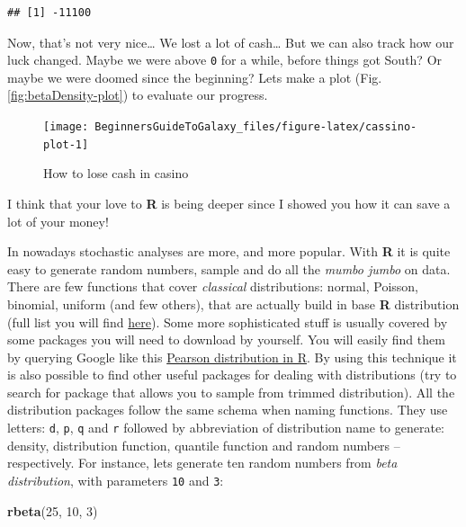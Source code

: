 \documentclass[]{book}
\newenvironment{Shaded}{\begin{snugshade}}{\end{snugshade}}
\newcommand{\KeywordTok}[1]{\textcolor[rgb]{0.13,0.29,0.53}{\textbf{#1}}}
\newcommand{\DecValTok}[1]{\textcolor[rgb]{0.00,0.00,0.81}{#1}}
\newcommand{\NormalTok}[1]{#1}
\theoremstyle{definition}
\theoremstyle{definition}
\theoremstyle{definition}
\theoremstyle{remark}
\begin{document}
\begin{verbatim}
## [1] -11100
\end{verbatim}

Now, that's not very nice\ldots{} We lost a lot of cash\ldots{} But we
can also track how our luck changed. Maybe we were above \texttt{0} for
a while, before things got South? Or maybe we were doomed since the
beginning? Lets make a plot (Fig. \ref{fig:betaDensity-plot}) to
evaluate our progress.

\begin{figure}

{\centering \texttt{[image: BeginnersGuideToGalaxy\_files/figure-latex/cassino-plot-1]} 

}

\caption{How to lose cash in casino}\label{fig:cassino-plot}
\end{figure}

I think that your love to \textbf{R} is being deeper since I showed you
how it can save a lot of your money!

In nowadays stochastic analyses are more, and more popular. With
\textbf{R} it is quite easy to generate random numbers, sample and do
all the \emph{mumbo jumbo} on data. There are few functions that cover
\emph{classical} distributions: normal, Poisson, binomial, uniform (and
few others), that are actually build in base \textbf{R} distribution
(full list you will find
\href{https://stat.ethz.ch/R-manual/R-devel/library/stats/html/Distributions.html}{here}).
Some more sophisticated stuff is usually covered by some packages you
will need to download by yourself. You will easily find them by querying
Google like this
\href{https://www.google.com/search?client=ubuntu\&channel=fs\&q=Pearson+distribution+in+R\&ie=utf-8\&oe=utf-8\&gfe_rd=cr\&dcr=0\&ei=KTI5Ws_7LfPBXrSBr7gO}{Pearson
distribution in R}. By using this technique it is also possible to find
other useful packages for dealing with distributions (try to search for
package that allows you to sample from trimmed distribution). All the
distribution packages follow the same schema when naming functions. They
use letters: \texttt{d}, \texttt{p}, \texttt{q} and \texttt{r} followed
by abbreviation of distribution name to generate: density, distribution
function, quantile function and random numbers -- respectively. For
instance, lets generate ten random numbers from \emph{beta
distribution}, with parameters \texttt{10} and \texttt{3}:

\begin{Shaded}
\begin{Highlighting}[]
\KeywordTok{rbeta}\NormalTok{(}\DecValTok{25}\NormalTok{, }\DecValTok{10}\NormalTok{, }\DecValTok{3}\NormalTok{)}
\end{Highlighting}
\end{Shaded}
\end{document}
